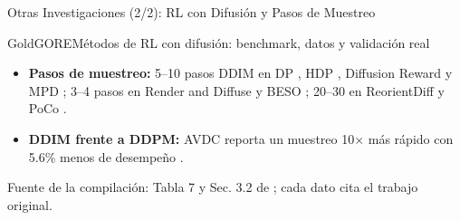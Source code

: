 \documentclass[aspectratio=169,10pt,xcolor={dvipsnames,table}]{beamer}
\begin{document}
\begin{frame}{Otras Investigaciones (2/2): RL con Difusión y Pasos de Muestreo}
\begin{Card}{GoldGORE}{Métodos de RL con difusión: benchmark, datos y validación real}
{    \vspace{1mm}
    \begin{itemize}\setlength{\itemsep}{0.6pt}
      \item[\textcolor{GoldGORE}{$\blacksquare$}] \textbf{Pasos de muestreo:} 5--10 pasos DDIM en DP \cite{chi2025diffusion}, HDP \cite{ma2024hdp}, Diffusion Reward \cite{huang2024diffusionreward} y MPD \cite{scheikl2024mpd}; 3--4 pasos en Render and Diffuse \cite{vosylius2024render} y BESO \cite{reuss2023beso}; 20--30 en ReorientDiff \cite{mishra2024reorientdiff} y PoCo \cite{wang2024poco}.
      \item[\textcolor{GoldGORE}{$\blacksquare$}] \textbf{DDIM frente a DDPM:} AVDC reporta un muestreo 10$\times$ más rápido con 5.6\% menos de desempeño \cite{ko2024avdc}.
    \end{itemize}
    \textcolor{TextDark!75}{Fuente de la compilación: Tabla 7 y Sec. 3.2 de \cite{wolf2025survey}; cada dato cita el trabajo original.}\par}
  \end{Card}
\end{frame}
\end{document}

